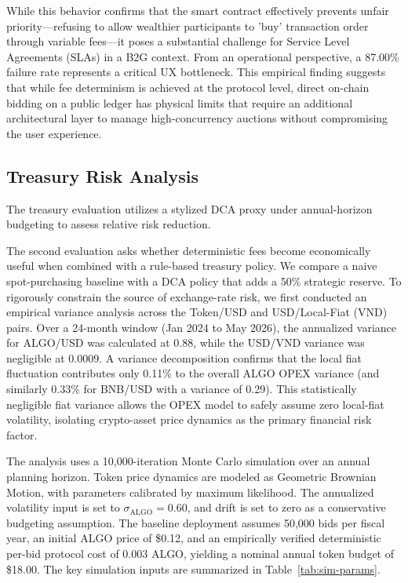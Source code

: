 \documentclass[runningheads]{llncs}
\begin{document}
While this behavior confirms that the smart contract effectively prevents unfair priority—refusing to allow wealthier participants to 'buy' transaction order through variable fees—it poses a substantial challenge for Service Level Agreements (SLAs) in a B2G context. From an operational perspective, a 87.00\% failure rate represents a critical UX bottleneck. This empirical finding suggests that while fee determinism is achieved at the protocol level, direct on-chain bidding on a public ledger has physical limits that require an additional architectural layer to manage high-concurrency auctions without compromising the user experience.

\subsection{Treasury Risk Analysis}

The treasury evaluation utilizes a stylized DCA proxy under annual-horizon budgeting to assess relative risk reduction.

The second evaluation asks whether deterministic fees become economically useful
when combined with a rule-based treasury policy. We compare a naive
spot-purchasing baseline with a DCA policy that adds a 50\% strategic reserve.
To rigorously constrain the source of exchange-rate risk, we first conducted an
empirical variance analysis across the Token/USD and USD/Local-Fiat (VND) pairs.
Over a 24-month window (Jan 2024 to May 2026), the annualized variance for 
ALGO/USD was calculated at 0.88, while the USD/VND variance was negligible at 0.0009. 
A variance decomposition confirms that the local fiat fluctuation contributes 
only 0.11\% to the overall ALGO OPEX variance (and similarly 0.33\% for BNB/USD 
with a variance of 0.29). This statistically negligible fiat variance allows the 
OPEX model to safely assume zero local-fiat volatility, isolating crypto-asset 
price dynamics as the primary financial risk factor.

The analysis uses a 10{,}000-iteration Monte Carlo simulation over an annual
planning horizon. Token price dynamics are modeled as Geometric Brownian
Motion, with parameters calibrated by maximum likelihood. The annualized volatility
input is set to $\sigma_{\text{ALGO}}=0.60$, and drift is set to
zero as a conservative budgeting assumption. The baseline deployment assumes
50{,}000 bids per fiscal year, an initial ALGO price of \$0.12, and an empirically verified deterministic
per-bid protocol cost of 0.003 ALGO, yielding a nominal annual token budget
of \$18.00. The key simulation inputs are summarized in
Table~\ref{tab:sim-params}.
\end{document}
